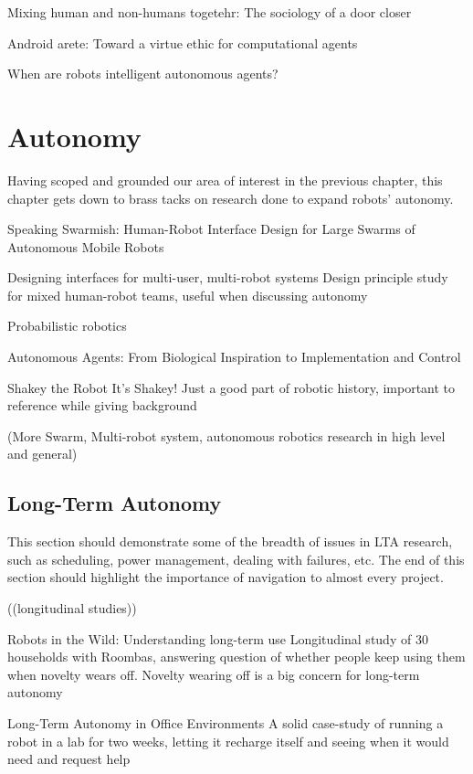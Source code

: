\documentclass{sfuthesis}
\begin{document}
Mixing human and non-humans togetehr: The sociology of a door closer

Android arete: Toward a virtue ethic for computational agents

When are robots intelligent autonomous agents?

\chapter{Autonomy}

Having scoped and grounded our area of interest in the previous chapter, this chapter gets down to brass tacks on research done to expand robots' autonomy.


Speaking Swarmish: Human-Robot Interface Design for Large Swarms of Autonomous Mobile Robots

Designing interfaces for multi-user, multi-robot systems	Design principle study for mixed human-robot teams, useful when discussing autonomy	

Probabilistic robotics

Autonomous Agents: From Biological Inspiration to Implementation and Control 


Shakey the Robot	It's Shakey! Just a good part of robotic history, important to reference while giving background


(More Swarm, Multi-robot system, autonomous robotics research in high level and general)

\section{Long-Term Autonomy}

This section should demonstrate some of the breadth of issues in LTA research, such as scheduling, power management, dealing with failures, etc. The end of this section should highlight the importance of navigation to almost every project.




((longitudinal studies))

Robots in the Wild: Understanding long-term use	Longitudinal study of 30 households with Roombas, answering question of whether people keep using them when novelty wears off. Novelty wearing off is a big concern for long-term autonomy	

Long-Term Autonomy in Office Environments	A solid case-study of running a robot in a lab for two weeks, letting it recharge itself and seeing when it would need and request help
\end{document}
